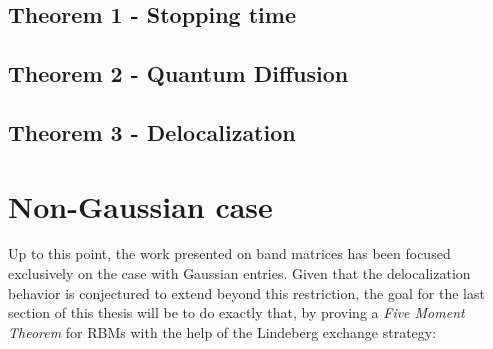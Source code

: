 \documentclass[11pt]{article}
\begin{document}
\subsection{Theorem 1 - Stopping time}
\label{proof-stop}

\subsection{Theorem 2 - Quantum Diffusion}

\subsection{Theorem 3 - Delocalization}
\label{proof-deloc}


\newpage

\section{Non-Gaussian case}
\label{sec:non-gaussian}
Up to this point, the work presented on band matrices has been focused exclusively on the case with Gaussian entries. Given that the delocalization behavior is conjectured to extend beyond this restriction, the goal for the last section of this thesis will be to do exactly that, by proving a \textit{Five Moment Theorem} for RBMs with the help of the Lindeberg exchange strategy:
\end{document}
